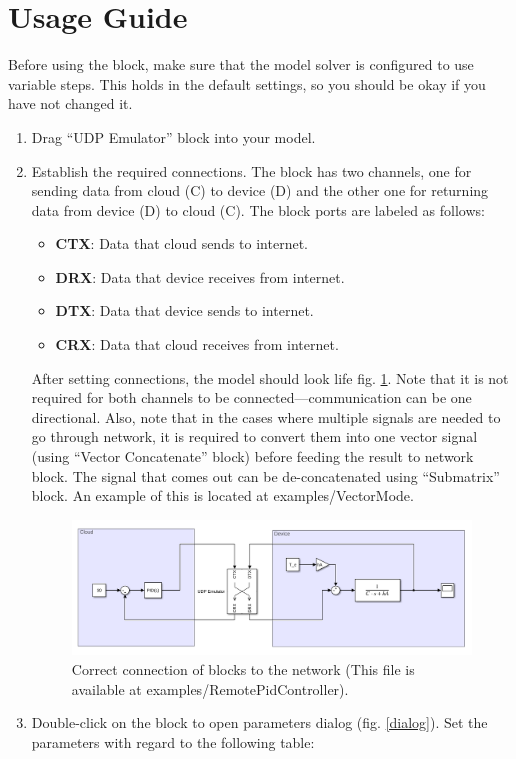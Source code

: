 \documentclass[a4paper, 11pt]{article}
\begin{document}
\section{Usage Guide}
Before using the block, make sure that the model solver is configured to use variable steps. This holds in the default settings, so you should be okay if you have not changed it.
\begin{enumerate}
\item Drag ``UDP Emulator'' block into your model.
\item Establish the required connections. The block has two channels, one for sending data from cloud (C) to device (D) and the other one for returning data from device (D) to cloud (C). The block ports are labeled as follows:
\begin{itemize}
\item[] \textbf{CTX}: Data that cloud sends to internet.
\item[] \textbf{DRX}: Data that device receives from internet.
\item[] \textbf{DTX}: Data that device sends to internet.
\item[] \textbf{CRX}: Data that cloud receives from internet.
\end{itemize}
After setting connections, the model should look life fig. \ref{model}. Note that it is not required for both channels to be connected---communication can be one directional. Also, note that in the cases where multiple signals are needed to go through network, it is required to convert them into one vector signal (using ``Vector Concatenate'' block) before feeding the result to network block. The signal that comes out can be de-concatenated using ``Submatrix'' block. An example of this is located at examples/VectorMode.
\begin{figure}[h]
\centering
\includegraphics[width=16cm]{img/model.png}
\caption{Correct connection of blocks to the network (This file is available at examples/RemotePidController).}
\label{model}
\end{figure}
\item Double-click on the block to open parameters dialog (fig. \ref{dialog}). Set the parameters with regard to the following table:

\end{enumerate}
\end{document}
